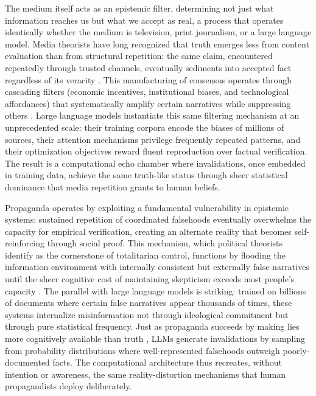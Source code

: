 \documentclass[12pt]{article}
\theoremstyle{definition}
\begin{document}
The medium itself acts as an epistemic filter, determining not just what information reaches us but what we accept as real, a process that operates identically whether the medium is television, print journalism, or a large language model. Media theorists have long recognized that truth emerges less from content evaluation than from structural repetition: the same claim, encountered repeatedly through trusted channels, eventually sediments into accepted fact regardless of its veracity \parencite{gerbner1976living, mcluhan1964understanding}. This manufacturing of consensus operates through cascading filters (economic incentives, institutional biases, and technological affordances) that systematically amplify certain narratives while suppressing others \parencite{herman1988manufacturing}. Large language models instantiate this same filtering mechanism at an unprecedented scale: their training corpora encode the biases of millions of sources, their attention mechanisms privilege frequently repeated patterns, and their optimization objectives reward fluent reproduction over factual verification. The result is a computational echo chamber where invalidations, once embedded in training data, achieve the same truth-like status through sheer statistical dominance that media repetition grants to human beliefs.

Propaganda operates by exploiting a fundamental vulnerability in epistemic systems: sustained repetition of coordinated falsehoods eventually overwhelms the capacity for empirical verification, creating an alternate reality that becomes self-reinforcing through social proof. This mechanism, which political theorists identify as the cornerstone of totalitarian control, functions by flooding the information environment with internally consistent but externally false narratives until the sheer cognitive cost of maintaining skepticism exceeds most people's capacity \parencite{arendt1951origins, ellul1965propaganda}. The parallel with large language models is striking: trained on billions of documents where certain false narratives appear thousands of times, these systems internalize misinformation not through ideological commitment but through pure statistical frequency. Just as propaganda succeeds by making lies more cognitively available than truth \parencite{ellul1965propaganda}, LLMs generate invalidations by sampling from probability distributions where well-represented falsehoods outweigh poorly-documented facts. The computational architecture thus recreates, without intention or awareness, the same reality-distortion mechanisms that human propagandists deploy deliberately.
\end{document}
